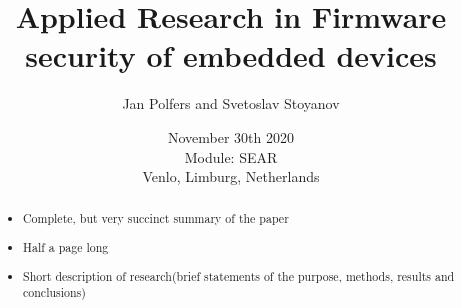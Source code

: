 \documentclass[]{report}
\title{Applied Research in Firmware security of embedded devices}
\author{Jan Polfers and Svetoslav Stoyanov}
\date{November 30th 2020 \\Module: SEAR \\Venlo, Limburg, Netherlands}
\begin{document}
\maketitle

\begin{abstract}

\begin{itemize}
	\item Complete, but very succinct summary of the paper
	\item Half a page long
	\item Short description of research(brief statements of the purpose, methods, results and conclusions)
\end{itemize}
\end{abstract}

\tableofcontents
\setcounter{page}{3}
\listoffigures %
\pagebreak

	
\end{document}
